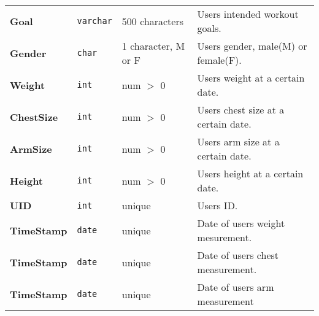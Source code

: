 \begin{adjustwidth}{-2.25cm}{}
\begin{center}
\begin{tabular}{l|lll}
        \textbf{Goal}             & \texttt{varchar}   & 500 characters        & Users intended workout goals.  \\
        \textbf{Gender}           & \texttt{char}      & 1 character, M or F   & Users gender, male(M) or female(F).  \\
        \textbf{Weight}           & \texttt{int}       & num $>$ 0             & Users weight at a certain date.  \\
        \textbf{ChestSize}        & \texttt{int}       & num $>$ 0             & Users chest size at a certain date.  \\ \midrule
        \textbf{ArmSize}          & \texttt{int}       & num $>$ 0             & Users arm size at a certain date.  \\
        \textbf{Height}           & \texttt{int}       & num $>$ 0             & Users height at a certain date.  \\
        \textbf{UID}              & \texttt{int}       & unique                & Users ID.  \\
        \textbf{TimeStamp}        & \texttt{date}      & unique                & Date of users weight mesurement.  \\ \midrule
        \textbf{TimeStamp}        & \texttt{date}      & unique                & Date of users chest measurement.  \\
        \textbf{TimeStamp}        & \texttt{date}      & unique                & Date of users arm measurement \\
        \bottomrule
    \end{tabular}
\end{center}
\end{adjustwidth}